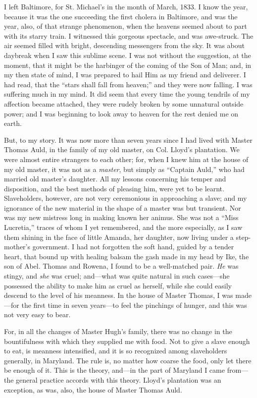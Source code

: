 I left Baltimore, for St. Michael's in the month of March, 1833. I know
the year, because it was the one succeeding the first cholera in
Baltimore, and was the year, also, of that strange phenomenon, when the
heavens seemed about to part with its starry train. I witnessed this
gorgeous spectacle, and was awe-struck. The air seemed filled with
bright, descending messengers from the sky. It was about daybreak when I
saw this sublime scene. I was not without the suggestion, at the moment,
that it might be the harbinger of the coming of the Son of Man; and, in
my then state of mind, I was prepared to hail Him as my friend and
deliverer. I had read, that the ``stars shall fall from heaven;'' and
they were now falling. I was suffering much in my mind. It did seem that
every time the young tendrils of my affection became attached, they were
{}rudely broken by some unnatural outside power; and I was beginning to
look away to heaven for the rest denied me on earth.

But, to my story. It was now more than seven years since I had lived
with Master Thomas Auld, in the family of my old master, on Col. Lloyd's
plantation. We were almost entire strangers to each other; for, when I
knew him at the house of my old master, it was not as a \emph{master},
but simply as ``Captain Auld,'' who had married old master's daughter.
All my lessons concerning his temper and disposition, and the best
methods of pleasing him, were yet to be learnt. Slaveholders, however,
are not very ceremonious in approaching a slave; and my ignorance of the
new material in the shape of a master was but transient. Nor was my new
mistress long in making known her animus. She was not a ``Miss
Lucretia,'' traces of whom I yet remembered, and the more especially, as
I saw them shining in the face of little Amanda, her daughter, now
living under a step-mother's government. I had not forgotten the soft
hand, guided by a tender heart, that bound up with healing balsam the
gash made in my head by Ike, the son of Abel. Thomas and Rowena, I found
to be a well-matched pair. \emph{He} was stingy, and \emph{she} was
cruel; and---what was quite natural in such cases---she possessed the
ability to make him as cruel as herself, while she could easily descend
to the level of his meanness. In the house of Master Thomas, I was
made---for the first time in seven years---to feel the pinchings of
hunger, and this was not very easy to bear.

For, in all the changes of Master Hugh's family, {}there was no change
in the bountifulness with which they supplied me with food. Not to give
a slave enough to eat, is meanness intensified, and it is so recognized
among slaveholders generally, in Maryland. The rule is, no matter how
coarse the food, only let there be enough of it. This is the theory,
and---in the part of Maryland I came from---the general practice accords
with this theory. Lloyd's plantation was an exception, as was, also, the
house of Master Thomas Auld.

